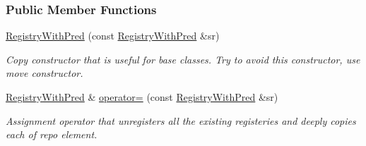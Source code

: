 \subsubsection*{Public Member Functions}
\begin{DoxyCompactItemize}
\item 
\hypertarget{a00074_a0e75c7daaa5fbf824b29180c7a5fd155}{}\hyperlink{a00074_a0e75c7daaa5fbf824b29180c7a5fd155}{Registry\+With\+Pred} (const \hyperlink{a00074}{Registry\+With\+Pred} \&sr)\label{a00074_a0e75c7daaa5fbf824b29180c7a5fd155}

\begin{DoxyCompactList}\small\item\em Copy constructor that is useful for base classes. Try to avoid this constructor, use move constructor. \end{DoxyCompactList}\item 
\hyperlink{a00074}{Registry\+With\+Pred} \& \hyperlink{a00074_adb7e568c8cb084589467b937eab86b86}{operator=} (const \hyperlink{a00074}{Registry\+With\+Pred} \&sr)
\begin{DoxyCompactList}\small\item\em Assignment operator that unregisters all the existing registeries and deeply copies each of repo element. \end{DoxyCompactList}\end{DoxyCompactItemize}
